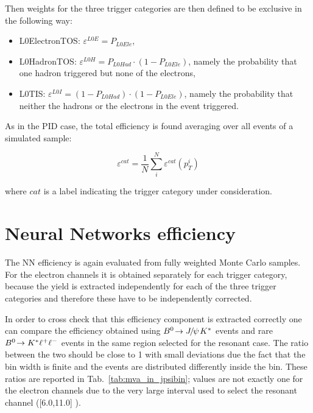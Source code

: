 Then weights for the three trigger categories are then defined to be exclusive in the following way:

\begin{itemize}
\item L0ElectronTOS: $\varepsilon^{L0E} = P_{L0Ele}$,
\item L0HadronTOS: $\varepsilon^{L0H} = P_{L0Had}\cdot(1 - P_{L0Ele})$, namely the probability that one hadron triggered but none of the electrons,
\item L0TIS: $\varepsilon^{L0I} = (1-P_{L0Had})\cdot(1 - P_{L0Ele})$, namely the probability that neither the hadrons or the electrons in the event triggered.
\end{itemize}

As in the PID case, the total efficiency is found averaging over all events of a simulated sample:

\begin{equation}
\varepsilon^{cat} = \frac{1}{N} \sum_i^N \varepsilon^{cat}(p_T^i)
\end{equation}

where $cat$ is a label indicating the trigger category under consideration.


\section{Neural Networks efficiency}
\label{sec:Rkst_mva_eff}

The NN efficiency is again evaluated from fully weighted Monte Carlo samples. 
For the electron channels it is obtained separately for each trigger category,
because the yield is extracted independently for each of the three trigger categories
and therefore these have to be independently corrected.

In order to cross check that this efficiency component is extracted correctly
one can compare the efficiency obtained using $\decay{\Bz}{\jpsi\Kstar}$ events
and rare ${{B}^0}\!\rightarrow {\ensuremath{{K}^*}} \ell^+\ell^-$ events in the same \qsq region selected
for the resonant case. The ratio between the two should be close to 1 with
small deviations due the fact that the bin width is finite and the events are distributed
differently inside the bin. These ratios are reported in Tab.~\ref{tab:mva_in_jpsibin};
values are not exactly one for the electron channels due to the very large \qsq interval
used to select the resonant channel ([6.0,11.0] \gevgevcccc).


